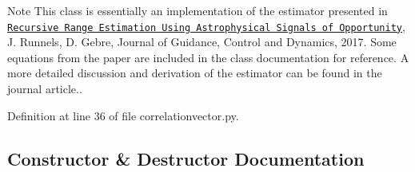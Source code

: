 \begin{DoxyNote}{Note}
This class is essentially an implementation of the estimator presented in \href{https://doi.org/10.2514/1.G002650}{\tt Recursive Range Estimation Using Astrophysical Signals of Opportunity}, J. Runnels, D. Gebre, Journal of Guidance, Control and Dynamics, 2017. Some equations from the paper are included in the class documentation for reference. A more detailed discussion and derivation of the estimator can be found in the journal article.. 
\end{DoxyNote}


Definition at line 36 of file correlationvector.\+py.



\subsection{Constructor \& Destructor Documentation}
